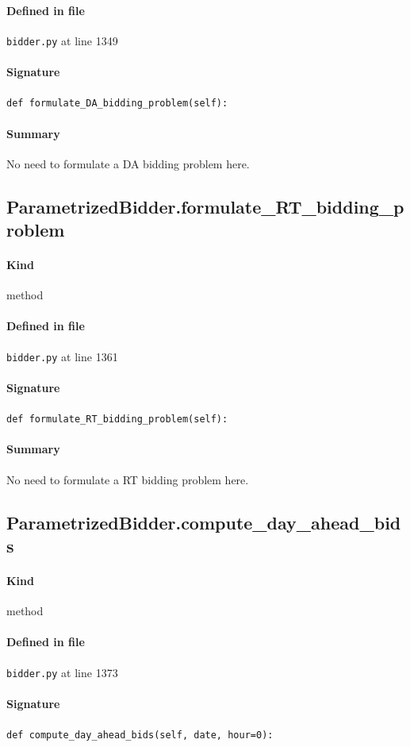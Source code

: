 \documentclass[11pt]{report}
\begin{document}
\paragraph{Defined in file} \texttt{bidder.py} at line 1349
\paragraph{Signature} \texttt{def formulate\_DA\_bidding\_problem(self):}
\paragraph{Summary} No need to formulate a DA bidding problem here.
\subsection{ParametrizedBidder.formulate\_RT\_bidding\_problem}
\label{def:bidder.py:ParametrizedBidder.formulate_RT_bidding_problem:L1361}
\paragraph{Kind} method
\paragraph{Defined in file} \texttt{bidder.py} at line 1361
\paragraph{Signature} \texttt{def formulate\_RT\_bidding\_problem(self):}
\paragraph{Summary} No need to formulate a RT bidding problem here.
\subsection{ParametrizedBidder.compute\_day\_ahead\_bids}
\label{def:bidder.py:ParametrizedBidder.compute_day_ahead_bids:L1373}
\paragraph{Kind} method
\paragraph{Defined in file} \texttt{bidder.py} at line 1373
\paragraph{Signature} \texttt{def compute\_day\_ahead\_bids(self, date, hour=0):}
\end{document}
